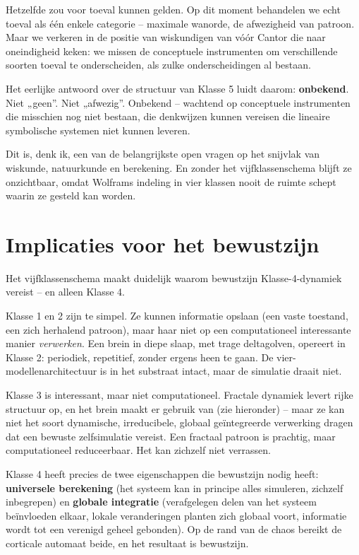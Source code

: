 \documentclass[11pt, twoside, openright]{book}
\begin{document}
Hetzelfde zou voor toeval kunnen gelden. Op dit moment behandelen we echt toeval als één enkele categorie -- maximale wanorde, de afwezigheid van patroon. Maar we verkeren in de positie van wiskundigen van vóór Cantor die naar oneindigheid keken: we missen de conceptuele instrumenten om verschillende soorten toeval te onderscheiden, als zulke onderscheidingen al bestaan.

Het eerlijke antwoord over de structuur van Klasse 5 luidt daarom: \textbf{onbekend}. Niet „geen”. Niet „afwezig”. Onbekend -- wachtend op conceptuele instrumenten die misschien nog niet bestaan, die denkwijzen kunnen vereisen die lineaire symbolische systemen niet kunnen leveren.

Dit is, denk ik, een van de belangrijkste open vragen op het snijvlak van wiskunde, natuurkunde en berekening. En zonder het vijfklassenschema blijft ze onzichtbaar, omdat Wolframs indeling in vier klassen nooit de ruimte schept waarin ze gesteld kan worden.

\section*{Implicaties voor het bewustzijn}

Het vijfklassenschema maakt duidelijk waarom bewustzijn Klasse-4-dynamiek vereist -- en alleen Klasse 4.

Klasse 1 en 2 zijn te simpel. Ze kunnen informatie opslaan (een vaste toestand, een zich herhalend patroon), maar haar niet op een computationeel interessante manier \textit{verwerken}. Een brein in diepe slaap, met trage deltagolven, opereert in Klasse 2: periodiek, repetitief, zonder ergens heen te gaan. De vier-modellenarchitectuur is in het substraat intact, maar de simulatie draait niet.

Klasse 3 is interessant, maar niet computationeel. Fractale dynamiek levert rijke structuur op, en het brein maakt er gebruik van (zie hieronder) -- maar ze kan niet het soort dynamische, irreducibele, globaal geïntegreerde verwerking dragen dat een bewuste zelfsimulatie vereist. Een fractaal patroon is prachtig, maar computationeel reduceerbaar. Het kan zichzelf niet verrassen.

Klasse 4 heeft precies de twee eigenschappen die bewustzijn nodig heeft: \textbf{universele berekening} (het systeem kan in principe alles simuleren, zichzelf inbegrepen) en \textbf{globale integratie} (verafgelegen delen van het systeem beïnvloeden elkaar, lokale veranderingen planten zich globaal voort, informatie wordt tot een verenigd geheel gebonden). Op de rand van de chaos bereikt de corticale automaat beide, en het resultaat is bewustzijn.
\end{document}
